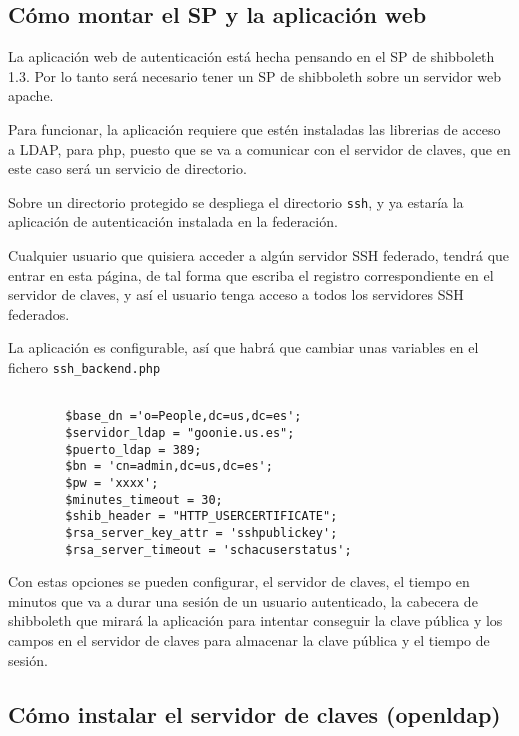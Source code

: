         \subsection{Cómo montar el SP y la aplicación web}

        La aplicación web de autenticación está hecha pensando en el
        SP de shibboleth 1.3. Por lo tanto será necesario tener un SP
        de shibboleth sobre un servidor web apache.

        Para funcionar, la aplicación requiere que estén instaladas
        las librerias de acceso a LDAP, para php, puesto que se va a
        comunicar con el servidor de claves, que en este caso será un
        servicio de directorio.
        
        Sobre un directorio protegido se despliega el directorio
        \texttt{ssh}, y ya estaría la aplicación de autenticación
        instalada en la federación.

        Cualquier usuario que quisiera acceder a algún servidor SSH
        federado, tendrá que entrar en esta página, de tal forma que
        escriba el registro correspondiente en el servidor de claves,
        y así el usuario tenga acceso a todos los servidores SSH
        federados.

        La aplicación es configurable, así que habrá que cambiar unas
        variables en el fichero \texttt{ssh\_backend.php}

        \begin{verbatim}

        $base_dn ='o=People,dc=us,dc=es';
        $servidor_ldap = "goonie.us.es";
        $puerto_ldap = 389;
        $bn = 'cn=admin,dc=us,dc=es';
        $pw = 'xxxx';
        $minutes_timeout = 30;
        $shib_header = "HTTP_USERCERTIFICATE";
        $rsa_server_key_attr = 'sshpublickey';
        $rsa_server_timeout = 'schacuserstatus';

        \end{verbatim}

        Con estas opciones se pueden configurar, el servidor de
        claves, el tiempo en minutos que va a durar una sesión de un
        usuario autenticado, la cabecera de shibboleth que mirará la
        aplicación para intentar conseguir la clave pública y los
        campos en el servidor de claves para almacenar la clave
        pública y el tiempo de sesión.

        \subsection{Cómo instalar el servidor de claves (openldap)}

